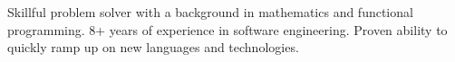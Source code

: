 

\begin{cvparagraph}

Skillful problem solver with a background in mathematics and
  functional programming.  8+ years of experience in
  software engineering.  Proven ability to quickly ramp up on new
  languages and technologies.
\end{cvparagraph}
